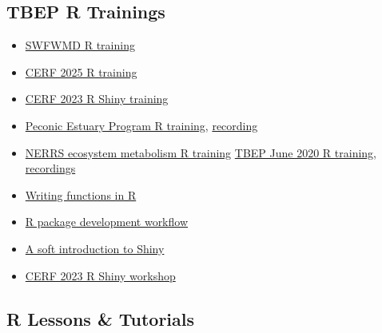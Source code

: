 \documentclass[
]{book}
\providecommand{\tightlist}{%
  \setlength{\itemsep}{0pt}\setlength{\parskip}{0pt}}
\begin{document}
\subsection{TBEP R Trainings}\label{tbep-r-trainings}

\begin{itemize}
\tightlist
\item
  \href{https://tbep-tech.github.io/swfwmd-r-training/}{SWFWMD R training}
\item
  \href{https://tbep-tech.github.io/cerf-r-workshop}{CERF 2025 R training}
\item
  \href{https://tbep-tech.github.io/shiny-workshop/}{CERF 2023 R Shiny training}
\item
  \href{https://tbep-tech.github.io/pep-r-training}{Peconic Estuary Program R training}, \href{https://drive.google.com/file/d/1ZjVHFrVpw2uTKZw-BmD29umdbl6viutM/view?usp=sharing}{recording}
\item
  \href{https://tbep-tech.github.io/ecometab-r-training}{NERRS ecosystem metabolism R training}
  \href{https://tbep-tech.github.io/tbep-r-training/}{TBEP June 2020 R training}, \href{https://www.youtube.com/watch?v=_RI4XMRWeV0&list=PLfJ6-D-exF9RM5TPtT4T0nxieqpr_R4pJ}{recordings}
\item
  \href{https://tbep-tech.github.io/tbep-r-training/functions.html}{Writing functions in R}
\item
  \href{https://tbep-tech.github.io/tbep-r-training/packages.html}{R package development workflow}
\item
  \href{https://tbep-tech.github.io/tbep-r-training/shiny.html}{A soft introduction to Shiny}
\item
  \href{https://tbep-tech.github.io/shiny-workshop/}{CERF 2023 R Shiny workshop}
\end{itemize}

\subsection{R Lessons \& Tutorials}\label{r-lessons-tutorials}
\end{document}
